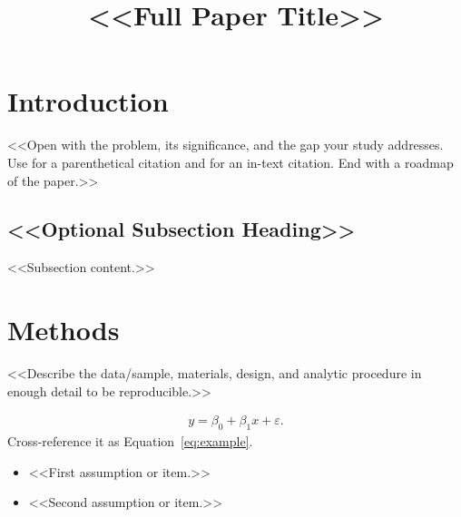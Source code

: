 \documentclass[man,floatsintext,longtable]{apa7}
\title{<<Full Paper Title>>}
\begin{document}
\maketitle

\section{Introduction}

<<Open with the problem, its significance, and the gap your study addresses. Use \parencite{example-article} for a parenthetical citation and \textcite{example-book} for an in-text citation. End with a roadmap of the paper.>>

\subsection{<<Optional Subsection Heading>>}

<<Subsection content.>>

\section{Methods}

<<Describe the data/sample, materials, design, and analytic procedure in enough detail to be reproducible.>>

\begin{align}\label{eq:example}
    y = \beta_0 + \beta_1 x + \varepsilon.
\end{align}
Cross-reference it as Equation~\eqref{eq:example}.

\begin{itemize}
    \item[(A1)] <<First assumption or item.>>
    \item[(A2)] <<Second assumption or item.>>
\end{itemize}

\end{document}
